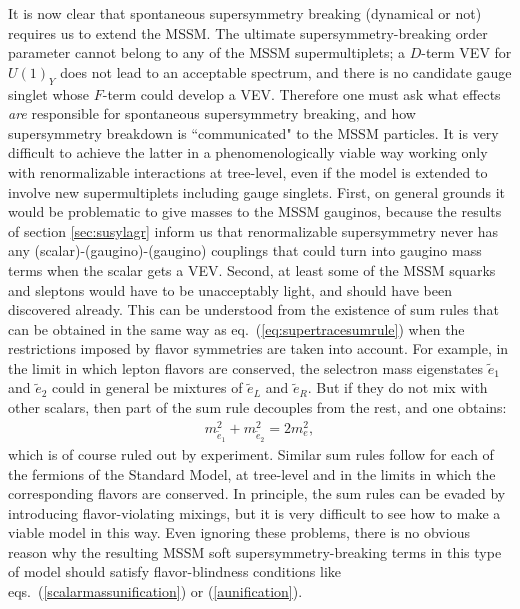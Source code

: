 \documentclass[11pt]{article}
\def\beq{\begin{eqnarray}}
\def\eeq{\end{eqnarray}}
\begin{document}
It is now clear that spontaneous supersymmetry breaking (dynamical or not)
requires us to extend the MSSM. The ultimate supersymmetry-breaking order
parameter cannot belong to any of the MSSM supermultiplets; a $D$-term VEV
for $U(1)_Y$ does not lead to an acceptable spectrum, and there is no
candidate gauge singlet whose $F$-term could develop a VEV. Therefore one
must ask what effects {\it are} responsible for spontaneous supersymmetry
breaking, and how supersymmetry breakdown is ``communicated" to the MSSM
particles.  It is very difficult to achieve the latter in a
phenomenologically viable way working only with renormalizable
interactions at tree-level, even if the model is extended to involve new
supermultiplets including gauge singlets. First, on general grounds it 
would be
problematic to give masses to the MSSM gauginos, because the results of
section \ref{sec:susylagr} inform us that renormalizable supersymmetry
never has any (scalar)-(gaugino)-(gaugino) couplings that could turn into
gaugino mass terms when the scalar gets a VEV.  Second, at least some of
the MSSM squarks and sleptons would have to be unacceptably light, and
should have been discovered already. This can be understood from the
existence of sum rules that can be obtained in the same way as
eq.~(\ref{eq:supertracesumrule}) when the restrictions imposed by flavor
symmetries are taken into account. For example, in the limit in which
lepton flavors are conserved, the selectron mass eigenstates $\tilde e_1$
and $\tilde e_2$ could in general be mixtures of $\tilde e_L$ and $\tilde
e_R$. But if they do not mix with other scalars, then part of the sum rule
decouples from the rest, and one obtains:
\beq
m_{\tilde e_1}^2 + m_{\tilde e_2}^2 = 2 m_e^2,
\label{eq:sumrulee}
\eeq
which is of course ruled out by experiment. Similar sum rules follow for
each of the fermions of the Standard Model, at tree-level and in the
limits in which the corresponding flavors are conserved. In principle, the
sum rules can be evaded by introducing flavor-violating mixings, but it is
very difficult to see how to make a viable model in this way.  Even
ignoring these problems, there is no obvious reason why the resulting MSSM
soft supersymmetry-breaking terms in this type of model should satisfy
flavor-blindness conditions like eqs.~(\ref{scalarmassunification}) or
(\ref{aunification}).
\end{document}

